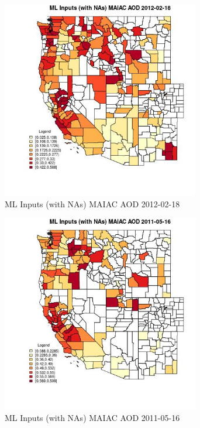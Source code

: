 \begin{figure} 
\centering  
\includegraphics[width=0.77\textwidth]{Code_Outputs/Report_ML_input_PM25_Step4_part_f_de_duplicated_aves_prioritize_24hr_obswNAs_CountyMAIAC_AODMean2012-02-18.jpg} 
\caption{\label{fig:Report_ML_input_PM25_Step4_part_f_de_duplicated_aves_prioritize_24hr_obswNAsCountyMAIAC_AODMean2012-02-18}ML Inputs (with NAs) MAIAC AOD 2012-02-18} 
\end{figure} 
 

\begin{figure} 
\centering  
\includegraphics[width=0.77\textwidth]{Code_Outputs/Report_ML_input_PM25_Step4_part_f_de_duplicated_aves_prioritize_24hr_obswNAs_CountyMAIAC_AODMean2011-05-16.jpg} 
\caption{\label{fig:Report_ML_input_PM25_Step4_part_f_de_duplicated_aves_prioritize_24hr_obswNAsCountyMAIAC_AODMean2011-05-16}ML Inputs (with NAs) MAIAC AOD 2011-05-16} 
\end{figure} 
 


